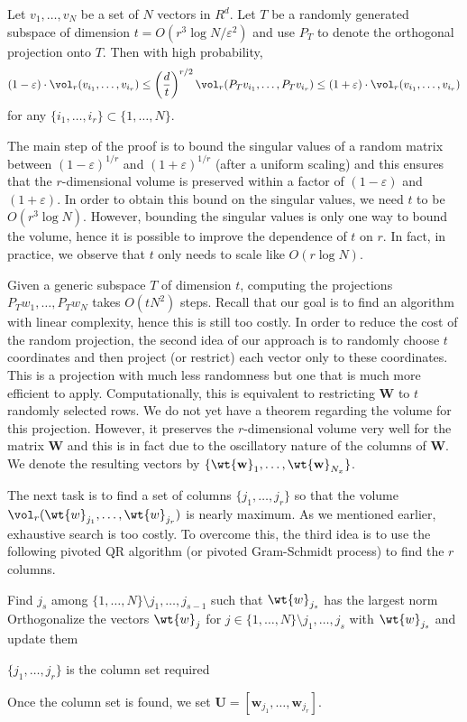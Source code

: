 \begin{theorem}
  Let $v_1,\ldots,v_N$ be a set of $N$ vectors in $R^d$. Let $T$ be a
  randomly generated subspace of dimension $t=O(r^3 \log N /\varepsilon^2)$
  and use $P_T$ to denote the orthogonal projection onto $T$. Then
  with high probability,
  \[
  (1-\varepsilon) \cdot \vol_r(v_{i_1},\ldots,v_{i_r}) \le
  \left(\frac{d}{t}\right)^{r/2}  \vol_r(P_T v_{i_1},\ldots,P_T v_{i_r}) \le
  (1+\varepsilon) \cdot \vol_r(v_{i_1},\ldots,v_{i_r})
  \]
  for any $\{i_1,\ldots,i_r\} \subset \{1,\ldots,N\}$.
\end{theorem}

The main step of the proof is to bound the singular values of a random
matrix between $(1-\varepsilon)^{1/r}$ and $(1+\varepsilon)^{1/r}$
(after a uniform scaling) and this ensures that the $r$-dimensional
volume is preserved within a factor of $(1-\varepsilon)$ and
$(1+\varepsilon)$. In order to obtain this bound on the singular
values, we need $t$ to be $O(r^3 \log N)$. However, bounding the
singular values is only one way to bound the volume, hence it is
possible to improve the dependence of $t$ on $r$. In fact, in
practice, we observe that $t$ only needs to scale like $O(r\log N)$.

Given a generic subspace $T$ of dimension $t$, computing the
projections $P_T w_1,\ldots, P_T w_N$ takes $O(tN^2)$ steps. Recall
that our goal is to find an algorithm with linear complexity, hence
this is still too costly. In order to reduce the cost of the random
projection, the second idea of our approach is to randomly choose $t$
coordinates and then project (or restrict) each vector only to these
coordinates. This is a projection with much less randomness but one
that is much more efficient to apply. Computationally, this is
equivalent to restricting $\mathbf{W}$ to $t$ randomly selected
rows. We do not yet have a theorem regarding the volume for this
projection. However, it preserves the $r$-dimensional volume very well
for the matrix $\mathbf{W}$ and this is in fact due to the oscillatory
nature of the columns of $\mathbf{W}$. We denote the resulting vectors by
$\{\mathbf{\wt{w}}_1,\ldots,\mathbf{\wt{w}}_{N_x}\}$.

The next task is to find a set of columns $\{j_1,\ldots,j_r\}$ so
that the volume $\vol_r(\wt{w}_{j_1},\ldots,\wt{w}_{j_r})$ is
nearly maximum. As we mentioned earlier, exhaustive search is too
costly. To overcome this, the third idea is to use the following
pivoted QR algorithm (or pivoted Gram-Schmidt process) to find the $r$
columns.
\begin{algorithmic}[1]

  \STATE Find $j_s$ among $\{1,\ldots,N\} \setminus {j_1,\ldots,j_{s-1}}$ such that
  $\wt{w}_{j_s}$ has the largest norm
  \STATE Orthogonalize the vectors $\wt{w}_j$ for $j\in \{1,\ldots,N\}
  \setminus {j_1,\ldots,j_s}$ with $\wt{w}_{j_s}$ and update them
  \ENDFOR

  \STATE $\{j_1,\ldots,j_r\}$ is the column set required
\end{algorithmic}
Once the column set is found, we set $\mathbf{U} = \left[ \mathbf{w}_{j_1},\ldots,\mathbf{w}_{j_r}\right]$.

